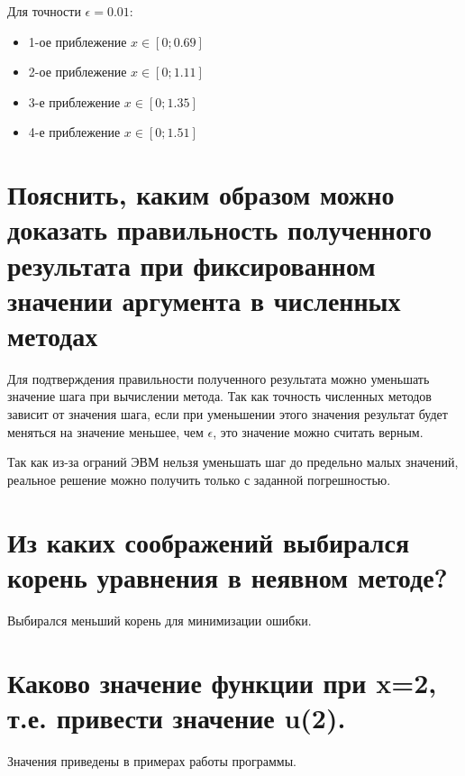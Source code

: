 \documentclass[12pt]{report}
\begin{document}
Для точности $\epsilon = 0.01$:
\begin{itemize}
	\item 1-ое приблежение $x \in [0;0.69]$
	\item 2-ое приблежение $x \in [0;1.11]$
	\item 3-е приблежение $x \in [0;1.35]$
	\item 4-е приблежение $x \in [0;1.51]$
\end{itemize}

\section*{Пояснить, каким образом можно доказать правильность полученного результата при фиксированном значении аргумента в численных методах}
Для подтверждения правильности полученного результата можно уменьшать значение шага при вычислении метода. Так как точность численных методов зависит от значения шага, если при уменьшении этого значения результат будет меняться на значение меньшее, чем $\epsilon$, это значение можно считать верным.

Так как из-за ограний ЭВМ нельзя уменьшать шаг до предельно малых значений, реальное решение можно получить только с заданной погрешностью.

\section*{Из каких соображений выбирался корень уравнения в неявном методе?}
Выбирался меньший корень для минимизации ошибки.


\section*{Каково значение функции при x=2, т.е. привести значение u(2).}
Значения приведены в примерах работы программы.
\end{document}

